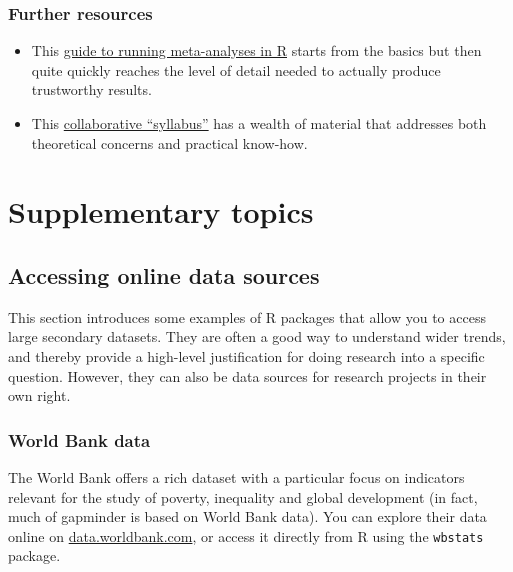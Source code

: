 \documentclass[
]{book}
\providecommand{\tightlist}{%
  \setlength{\itemsep}{0pt}\setlength{\parskip}{0pt}}
\begin{document}
\hypertarget{further-resources-meta}{%
\section{Further resources}\label{further-resources-meta}}

\begin{itemize}
\tightlist
\item
  This \href{https://bookdown.org/MathiasHarrer/Doing_Meta_Analysis_in_R/}{guide to running meta-analyses in R} starts from the basics but then quite quickly reaches the level of detail needed to actually produce trustworthy results.
\item
  This \href{http://mgto.org/metaanalysissyllabus}{collaborative ``syllabus''} has a wealth of material that addresses both theoretical concerns and practical know-how.
\end{itemize}

\hypertarget{part-supplementary-topics}{%
\part*{Supplementary topics}\label{part-supplementary-topics}}

\hypertarget{accessing-online-data-sources}{%
\chapter{Accessing online data sources}\label{accessing-online-data-sources}}

This section introduces some examples of R packages that allow you to access large secondary datasets. They are often a good way to understand wider trends, and thereby provide a high-level justification for doing research into a specific question. However, they can also be data sources for research projects in their own right.

\hypertarget{world-bank-data}{%
\section{World Bank data}\label{world-bank-data}}

The World Bank offers a rich dataset with a particular focus on indicators relevant for the study of poverty, inequality and global development (in fact, much of gapminder is based on World Bank data). You can explore their data online on \href{https://data.worldbank.com}{data.worldbank.com}, or access it directly from R using the \texttt{wbstats} package.
\end{document}
